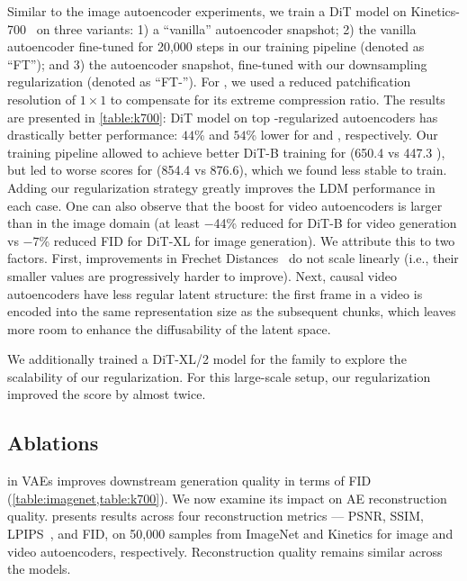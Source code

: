 Similar to the image autoencoder experiments, we train a DiT model on Kinetics-700~\cite{kinetics700} on three variants: 1) a ``vanilla'' autoencoder snapshot; 2) the vanilla autoencoder fine-tuned for 20,000 steps in our training pipeline (denoted as ``FT''); and 3) the autoencoder snapshot, fine-tuned with our downsampling regularization (denoted as ``FT-\regshortname'').
For \ltxae, we used a reduced patchification resolution of $1 \times 1$ to compensate for its extreme compression ratio.
The results are presented in \cref{table:k700}: DiT model on top \regshortname-regularized autoencoders has drastically better performance: $44$\% and $54$\% lower \fvd for \cvae and \ltxae, respectively.
Our training pipeline allowed to achieve better DiT-B training for \cvae (650.4 vs 447.3 \fvd), but led to worse scores for \ltxae (854.4 vs 876.6), which we found less stable to train.
Adding our regularization strategy greatly improves the LDM performance in each case.
One can also observe that the boost for video autoencoders is larger than in the image domain (at least $-$44\% reduced \fvd for DiT-B for video generation vs $-7$\% reduced FID for DiT-XL for image generation).
We attribute this to two factors.
First, improvements in Frechet Distances~\cite{FID} do not scale linearly (i.e., their smaller values are progressively harder to improve).
Next, causal video autoencoders have less regular latent structure: the first frame in a video is encoded into the same representation size as the subsequent chunks, which leaves more room to enhance the diffusability of the latent space.

We additionally trained a DiT-XL/2 model for the \cvae family to explore the scalability of our regularization.
For this large-scale setup, our \regshortname regularization improved the \fvd score by almost twice.


\subsection{Ablations}


\regname in VAEs improves downstream generation quality in terms of FID (\cref{table:imagenet,table:k700}).
We now examine its impact on AE reconstruction quality.  presents results across four reconstruction metrics — PSNR, SSIM, LPIPS~\cite{lpips}, and FID, on 50,000 samples from ImageNet and Kinetics for image and video autoencoders, respectively. Reconstruction quality remains similar across the models. 

